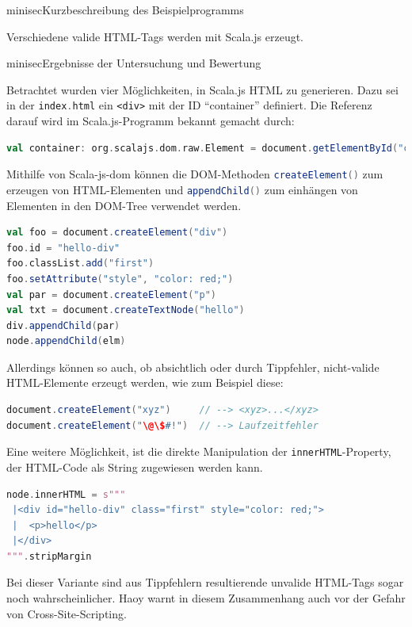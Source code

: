 \documentclass[a4paper, 12pt, hidelinks, listof=totoc, listoftables=totoc, bibliography=totoc]{scrreprt}
\newcommand{\code}[1]{\lstinline[language=Scala, style=inline]|#1|}
\newcommand{\scala}[1]{\lstinline[language=Scala, style=inline]|#1|}
\newcommand{\html}[1]{\lstinline[language=HTML5, style=inline]|#1|}
\begin{document}
minisec{Kurzbeschreibung des Beispielprogramms}

Verschiedene valide HTML-Tags werden mit Scala.js erzeugt.

minisec{Ergebnisse der Untersuchung und Bewertung}

Betrachtet wurden vier Möglichkeiten, in Scala.js HTML zu generieren. Dazu sei in der \code{index.html} ein
\html{<div>} mit der ID "`container"' definiert. Die Referenz darauf wird im Scala.js-Programm bekannt gemacht durch:

\begin{lstlisting}[language=Scala, style=snippet]
val container: org.scalajs.dom.raw.Element = document.getElementById("container")
\end{lstlisting}

Mithilfe von Scala-js-dom können die \ac{DOM}-Methoden \scala{createElement()} zum erzeugen von HTML-Elementen und \scala{appendChild()} zum einhängen von Elementen in den DOM-Tree verwendet werden.

\begin{lstlisting}[language=Scala, caption={HTML-Generierung mit Scala-js-dom und Nodes.}]
val foo = document.createElement("div")
foo.id = "hello-div"
foo.classList.add("first")
foo.setAttribute("style", "color: red;")
val par = document.createElement("p")
val txt = document.createTextNode("hello")
div.appendChild(par)
node.appendChild(elm)
\end{lstlisting}

Allerdings können so auch, ob absichtlich oder durch Tippfehler, nicht-valide HTML-Elemente erzeugt werden, wie zum Beispiel diese:
\begin{lstlisting}[language=Scala, style=snippet]
document.createElement("xyz")     // --> <xyz>...</xyz>
document.createElement("\@\$#!")  // --> Laufzeitfehler
\end{lstlisting}

Eine weitere Möglichkeit, ist die direkte Manipulation der \code{innerHTML}-Property, der HTML-Code als String zugewiesen werden kann.

\begin{lstlisting}[language=Scala, caption={HTML-Generierung mit Scala-js-dom und Strings.}]
node.innerHTML = s"""
 |<div id="hello-div" class="first" style="color: red;">
 |  <p>hello</p>
 |</div>
""".stripMargin
\end{lstlisting}

Bei dieser Variante sind aus Tippfehlern resultierende unvalide HTML-Tags sogar noch wahrscheinlicher. Haoy warnt in diesem Zusammenhang auch vor der Gefahr von Cross-Site-Scripting.\cite[\#HelloWorld:HTML]{haoyi.HOS}
\end{document}
